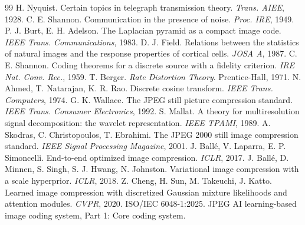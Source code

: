 \documentclass[aspectratio=169]{beamer}
\begin{document}
\begin{frame}[t]
  \tiny
  \begin{thebibliography}{99}
     H. Nyquist. Certain topics in telegraph transmission theory. \emph{Trans. AIEE}, 1928.
     C. E. Shannon. Communication in the presence of noise. \emph{Proc. IRE}, 1949.
     P. J. Burt, E. H. Adelson. The Laplacian pyramid as a compact image code. \emph{IEEE Trans. Communications}, 1983.
     D. J. Field. Relations between the statistics of natural images and the response properties of cortical cells. \emph{JOSA A}, 1987.
     C. E. Shannon. Coding theorems for a discrete source with a fidelity criterion. \emph{IRE Nat. Conv. Rec.}, 1959.
     T. Berger. \emph{Rate Distortion Theory}. Prentice-Hall, 1971.
     N. Ahmed, T. Natarajan, K. R. Rao. Discrete cosine transform. \emph{IEEE Trans. Computers}, 1974.
     G. K. Wallace. The JPEG still picture compression standard. \emph{IEEE Trans. Consumer Electronics}, 1992.
     S. Mallat. A theory for multiresolution signal decomposition: the wavelet representation. \emph{IEEE TPAMI}, 1989.
     A. Skodras, C. Christopoulos, T. Ebrahimi. The JPEG 2000 still image compression standard. \emph{IEEE Signal Processing Magazine}, 2001.
     J. Ball\'e, V. Laparra, E. P. Simoncelli. End-to-end optimized image compression. \emph{ICLR}, 2017.
     J. Ball\'e, D. Minnen, S. Singh, S. J. Hwang, N. Johnston. Variational image compression with a scale hyperprior. \emph{ICLR}, 2018.
     Z. Cheng, H. Sun, M. Takeuchi, J. Katto. Learned image compression with discretized Gaussian mixture likelihoods and attention modules. \emph{CVPR}, 2020.
     ISO/IEC 6048-1:2025. JPEG AI learning-based image coding system, Part 1: Core coding system.
  \end{thebibliography}
\end{frame}
\end{document}
